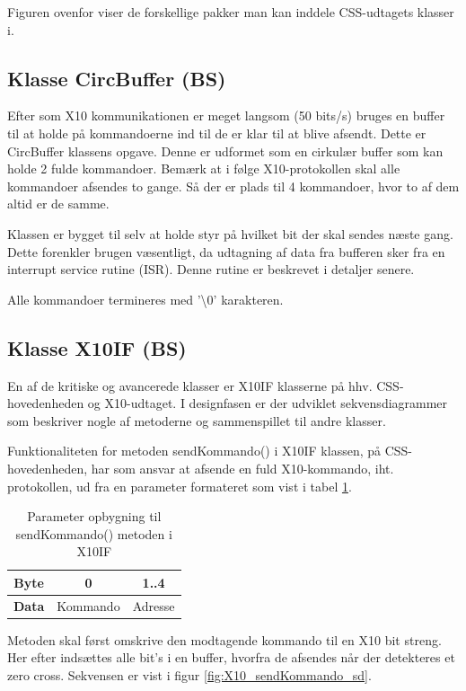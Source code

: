 Figuren ovenfor viser de forskellige pakker man kan inddele CSS-udtagets klasser i. 

\clearpage

\subsection{Klasse CircBuffer (BS)}
Efter som X10 kommunikationen er meget langsom (50 bits/s) bruges en buffer til at holde på kommandoerne ind til de er klar til at blive afsendt. Dette er CircBuffer klassens opgave.
Denne er udformet som en cirkulær buffer som kan holde 2 fulde kommandoer. Bemærk at i følge X10-protokollen skal alle kommandoer afsendes to gange. Så der er plads til 4 kommandoer, hvor to af dem altid er de samme.

Klassen er bygget til selv at holde styr på hvilket bit der skal sendes næste gang. Dette forenkler brugen væsentligt, da udtagning af data fra bufferen sker fra en interrupt service rutine (ISR). Denne rutine er beskrevet i detaljer senere.

Alle kommandoer termineres med '\textbackslash 0' karakteren. 

\subsection{Klasse X10IF (BS)}
En af de kritiske og avancerede klasser er X10IF klasserne på hhv. CSS-hovedenheden og X10-udtaget. I designfasen er der udviklet sekvensdiagrammer som beskriver nogle af metoderne og sammenspillet til andre klasser.

Funktionaliteten for metoden sendKommando() i X10IF klassen, på CSS-hovedenheden, har som ansvar at afsende en fuld X10-kommando, iht. protokollen, ud fra en parameter formateret som vist i tabel \ref{table:X10_sendKommando_format}.

\begin{table}[h]
	\caption{Parameter opbygning til sendKommando() metoden i X10IF}
	\centering
	\begin{tabular}{|c|c|c|}
		\hline 
		\textbf{Byte} & 0 & 1..4 \\ \hline
		\textbf{Data} & Kommando & Adresse \\ 
		\hline 
	\end{tabular} 
	\label{table:X10_sendKommando_format}
\end{table}

Metoden skal først omskrive den modtagende kommando til en X10 bit streng. Her efter indsættes alle bit's i en buffer, hvorfra de afsendes når der detekteres et zero cross. 
Sekvensen er vist i figur \ref{fig:X10_sendKommando_sd}.

